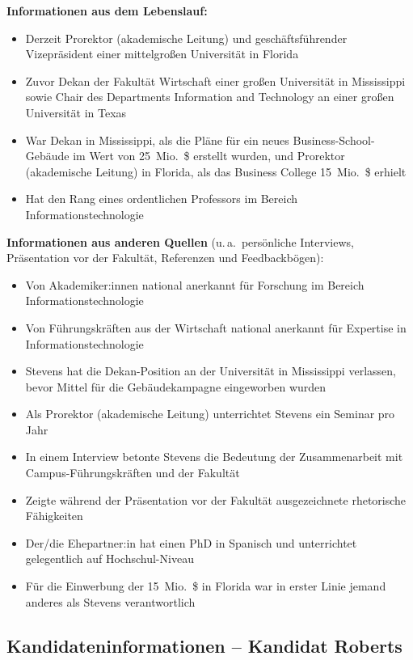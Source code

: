 \textbf{Informationen aus dem Lebenslauf:}
\begin{itemize}
  \item Derzeit Prorektor (akademische Leitung) und geschäftsführender Vizepräsident einer mittelgroßen
    Universität in Florida
  \item Zuvor Dekan der Fakultät Wirtschaft einer großen Universität in Mississippi sowie Chair des Departments
    Information and Technology an einer großen Universität in Texas
  \item War Dekan in Mississippi, als die Pläne für ein neues Business-School-Gebäude im Wert von
    25~Mio.\ \$ erstellt wurden, und Prorektor (akademische Leitung) in Florida, als das Business College
    15~Mio.\ \$ erhielt
  \item Hat den Rang eines ordentlichen Professors im Bereich Informationstechnologie
\end{itemize}

\textbf{Informationen aus anderen Quellen}
(u.\,a.\ persönliche Interviews, Präsentation vor der Fakultät, Referenzen und Feedbackbögen):
\begin{itemize}
  \item Von Akademiker:innen national anerkannt für Forschung im Bereich Informationstechnologie
  \item Von Führungskräften aus der Wirtschaft national anerkannt für Expertise in Informationstechnologie
  \item Stevens hat die Dekan-Position an der Universität in Mississippi verlassen, bevor Mittel für die
    Gebäudekampagne eingeworben wurden
  \item Als Prorektor (akademische Leitung) unterrichtet Stevens ein Seminar pro Jahr
  \item In einem Interview betonte Stevens die Bedeutung der Zusammenarbeit mit Campus-Führungskräften
    und der Fakultät
  \item Zeigte während der Präsentation vor der Fakultät ausgezeichnete rhetorische Fähigkeiten
  \item Der/die Ehepartner:in hat einen PhD in Spanisch und unterrichtet gelegentlich auf Hochschul-Niveau
  \item Für die Einwerbung der 15~Mio.\ \$ in Florida war in erster Linie jemand anderes als Stevens
    verantwortlich
\end{itemize}

\clearpage
\subsection*{Kandidateninformationen -- Kandidat Roberts}
\thispagestyle{empty}

